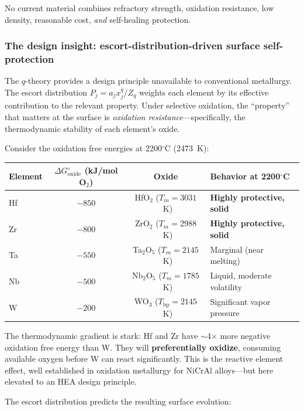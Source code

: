 \documentclass[12pt,letterpaper]{article}
\theoremstyle{definition}
\begin{document}
No current material combines refractory strength, oxidation resistance, low density, reasonable cost, \emph{and} self-healing protection.

\subsubsection{The design insight: escort-distribution-driven surface self-protection}

The $q$-theory provides a design principle unavailable to conventional metallurgy.  The escort distribution $P_j = a_j x_j^q / Z_q$ weights each element by its effective contribution to the relevant property.  Under selective oxidation, the ``property'' that matters at the surface is \emph{oxidation resistance}---specifically, the thermodynamic stability of each element's oxide.

Consider the oxidation free energies at 2200$^\circ$C (2473~K):
\begin{center}
\begin{tabular}{@{}lccl@{}}
\toprule
Element & $\Delta G^\circ_{\mathrm{oxide}}$ (kJ/mol O$_2$) & Oxide & Behavior at 2200$^\circ$C \\
\midrule
Hf & $-850$ & HfO$_2$ ($T_m = 3031$~K) & \textbf{Highly protective, solid} \\
Zr & $-800$ & ZrO$_2$ ($T_m = 2988$~K) & \textbf{Highly protective, solid} \\
Ta & $-550$ & Ta$_2$O$_5$ ($T_m = 2145$~K) & Marginal (near melting) \\
Nb & $-500$ & Nb$_2$O$_5$ ($T_m = 1785$~K) & Liquid, moderate volatility \\
W  & $-200$ & WO$_3$ ($T_{\mathrm{bp}} = 2145$~K) & Significant vapor pressure \\
\bottomrule
\end{tabular}
\end{center}

The thermodynamic gradient is stark: Hf and Zr have $\sim$4$\times$ more negative oxidation free energy than W.  They will \textbf{preferentially oxidize}, consuming available oxygen before W can react significantly.  This is the reactive element effect, well established in oxidation metallurgy for NiCrAl alloys---but here elevated to an HEA design principle.

The escort distribution predicts the resulting surface evolution:
\end{document}
